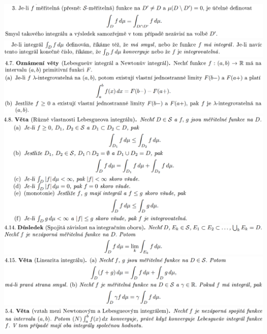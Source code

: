 \documentclass[12pt,a4paper]{article}
\begin{document}
\begin{center}
		\includegraphics[width=\textwidth]{img/1lebInt/2020-06-20 17 55 05.png}\vspace{0.3cm}
		\includegraphics[width=\textwidth]{img/1lebInt/2020-06-20 17 55 16.png}\vspace{0.3cm}
		\includegraphics[width=\textwidth]{img/1lebInt/2020-06-20 17 55 56.png}\vspace{0.3cm}
		\includegraphics[width=\textwidth]{img/1lebInt/2020-06-20 17 56 17.png}\vspace{0.3cm}
		\includegraphics[width=\textwidth]{img/1lebInt/2020-06-20 17 57 03.png}\vspace{0.3cm}
		\includegraphics[width=\textwidth]{img/1lebInt/2020-06-20 17 57 10.png}\vspace{0.3cm}
		\includegraphics[width=\textwidth]{img/1lebInt/2020-06-20 17 57 40.png}\vspace{0.3cm}

\end{center}
\end{document}

